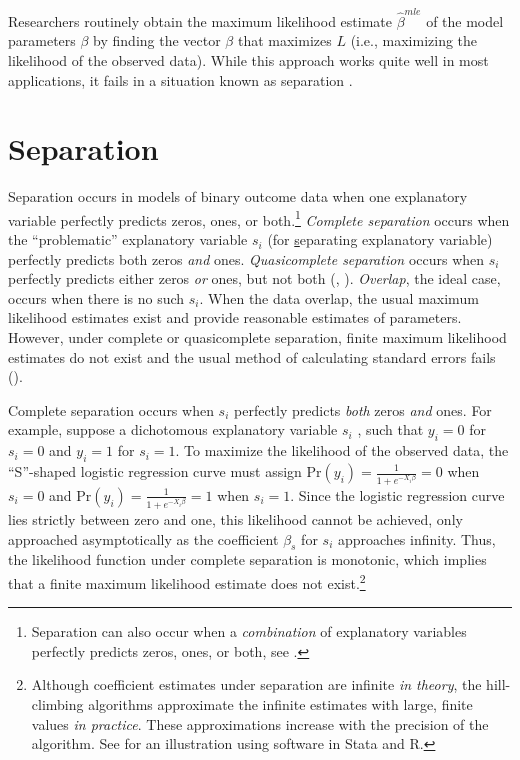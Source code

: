 \documentclass[12pt]{article}
\begin{document}
Researchers routinely obtain the maximum likelihood estimate $\hat{\beta}^{mle}$ of the model parameters $\beta$ by finding the vector $\beta$ that maximizes $L$ (i.e., maximizing the likelihood of the observed data). While this approach works quite well in most applications, it fails in a situation known as separation \citep{Zorn2005}.

\section*{Separation}

Separation occurs in models of binary outcome data when one explanatory variable perfectly predicts zeros, ones, or both.\footnote{Separation can also occur when a \emph{combination} of explanatory variables perfectly predicts zeros, ones, or both, see \cite{LesaffreAlbert1989}.} \textit{Complete separation} occurs when the ``problematic'' explanatory variable $s_i$ (for \underline{s}eparating explanatory variable) perfectly predicts both zeros \emph{and} ones. \textit{Quasicomplete separation} occurs when $s_i$ perfectly predicts either zeros \emph{or} ones, but not both (\citealt{AlbertAnderson1984}, \citealt{Zorn2005}). \textit{Overlap}, the ideal case, occurs when there is no such $s_i$. When the data overlap, the usual maximum likelihood estimates exist and provide reasonable estimates of parameters. However, under complete or quasicomplete separation, finite maximum likelihood estimates do not exist and the usual method of calculating standard errors fails (\citealt{AlbertAnderson1984, Zorn2005}).

Complete separation occurs when $s_i$ perfectly predicts \emph{both} zeros \emph{and} ones. For example, suppose a dichotomous explanatory variable $s_i$ , such that $y_i = 0$ for $s_i = 0$ and $y_i = 1$ for $s_i = 1$. To maximize the likelihood of the observed data, the ``S''-shaped logistic regression curve must assign $\text{Pr}(y_i) = \frac{1}{1 + e^{-X_i\beta}} = 0$ when $s_i  = 0$ and $\text{Pr}(y_i) = \frac{1}{1 + e^{-X_i\beta}} = 1$ when $s_i = 1$. Since the logistic regression curve lies strictly between zero and one, this likelihood cannot be achieved, only approached asymptotically as the coefficient $\beta_s$ for $s_i$ approaches infinity. Thus, the likelihood function under complete separation is monotonic, which implies that a finite maximum likelihood estimate does not exist.\footnote{Although coefficient estimates under separation are infinite \emph{in theory}, the hill-climbing algorithms approximate the infinite estimates with large, finite values \emph{in practice}. These approximations increase with the precision of the algorithm. See \cite{Zorn2005} for an illustration using software in Stata and R.}
\end{document}
